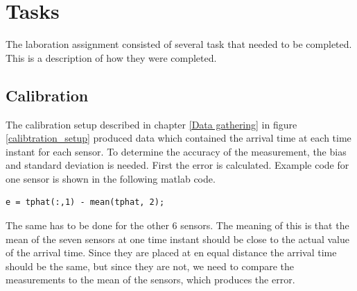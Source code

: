 \documentclass[10pt,a4paper]{report}
\begin{document}
\newpage
\chapter{Tasks}
\label{Tasks}
The laboration assignment consisted of several task that needed to be completed. This is a description of how they were completed.

\newpage
\section{Calibration}
\label{Calibration}
The calibration setup described in chapter \ref{Data gathering} in figure \ref{calibtration_setup} produced data which contained the arrival time at each time instant for each sensor. To determine the accuracy of the measurement, the bias and standard deviation is needed. First the error is calculated. Example code for one sensor is shown in the following matlab code. 
\begin{verbatim}
e = tphat(:,1) - mean(tphat, 2);
\end{verbatim}
The same has to be done for the other 6 sensors. The meaning of this is that the mean of the seven sensors at one time instant should be close to the actual value of the arrival time. Since they are placed at en equal distance the arrival time should be the same, but since they are not, we need to compare the measurements to the mean of the sensors, which produces the error.
\end{document}
